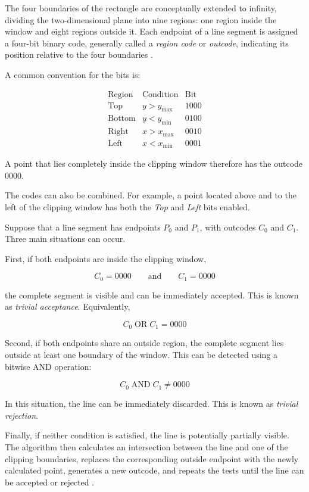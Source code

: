 The four boundaries of the rectangle are conceptually extended to infinity, dividing the two-dimensional plane into nine regions: one region inside the window and eight regions outside it. Each endpoint of a line segment is assigned a four-bit binary code, generally called a \textit{region code} or \textit{outcode}, indicating its position relative to the four boundaries \cite{MatthesDrakopoulos2022}.

A common convention for the bits is:

\[
\begin{array}{c|c|c}
\text{Region} & \text{Condition} & \text{Bit} \\
\hline
\text{Top}    & y > y_{\max} & 1000 \\
\text{Bottom} & y < y_{\min} & 0100 \\
\text{Right}  & x > x_{\max} & 0010 \\
\text{Left}   & x < x_{\min} & 0001
\end{array}
\]

A point that lies completely inside the clipping window therefore has the outcode 0000.

The codes can also be combined. For example, a point located above and to the left of the clipping window has both the \textit{Top} and \textit{Left} bits enabled.

Suppose that a line segment has endpoints $P_0$ and $P_1$, with outcodes $C_0$ and $C_1$. Three main situations can occur.

First, if both endpoints are inside the clipping window,

\[C_0 = 0000 \qquad \text{and} \qquad C_1 = 0000\]

the complete segment is visible and can be immediately accepted. This is known
as \textit{trivial acceptance}. Equivalently,

\[C_0 \; \mathrm{OR} \; C_1 = 0000\]

Second, if both endpoints share an outside region, the complete segment lies outside at least one boundary of the window. This can be detected using a bitwise AND operation:

\[C_0 \; \mathrm{AND} \; C_1 \neq 0000\]

In this situation, the line can be immediately discarded. This is known as \textit{trivial rejection}.

Finally, if neither condition is satisfied, the line is potentially partially visible. The algorithm then calculates an intersection between the line and one of the clipping boundaries, replaces the corresponding outside endpoint with the newly calculated point, generates a new outcode, and repeats the tests until the line can be accepted or rejected \cite{MatthesDrakopoulos2022,Clipping6thSem}.

